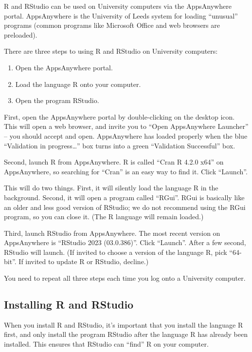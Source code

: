 \documentclass[
  a4paper,
]{book}
\providecommand{\tightlist}{%
  \setlength{\itemsep}{0pt}\setlength{\parskip}{0pt}}
\theoremstyle{definition}
\theoremstyle{definition}
\theoremstyle{definition}
\theoremstyle{definition}
\theoremstyle{remark}
\begin{document}
R and RStudio can be used on University computers via the AppsAnywhere portal. AppsAnywhere is the University of Leeds system for loading ``unusual'' programs (common programs like Microsoft Office and web browsers are preloaded).

There are three steps to using R and RStudio on University computers:

\begin{enumerate}
\def\labelenumi{\arabic{enumi}.}
\tightlist
\item
  Open the AppsAnywhere portal.
\item
  Load the language R onto your computer.
\item
  Open the program RStudio.
\end{enumerate}

First, open the AppsAnywhere portal by double-clicking on the desktop icon. This will open a web browser, and invite you to ``Open AppsAnywhere Launcher'' -- you should accept and open. AppsAnywhere has loaded properly when the blue ``Validation in progress\ldots{}'' box turns into a green ``Validation Successful'' box.

Second, launch R from AppsAnywhere. R is called ``Cran R 4.2.0 x64'' on AppsAnywhere, so searching for ``Cran'' is an easy way to find it. Click ``Launch''.

This will do two things. First, it will silently load the language R in the background. Second, it will open a program called ``RGui''. RGui is basically like an older and less good version of RStudio; we do not recommend using the RGui program, so you can close it. (The R language will remain loaded.)

Third, launch RStudio from AppsAnywhere. The most recent version on AppsAnywhere is ``RStudio 2023 (03.0.386)''. Click ``Launch''. After a few second, RStudio will launch. (If invited to choose a version of the language R, pick ``64-bit''. If invited to update R or RStudio, decline.)

You need to repeat all three steps each time you log onto a University computer.

\hypertarget{r-install}{%
\subsection*{Installing R and RStudio}\label{r-install}}

When you install R and RStudio, it's important that you install the language R first, and only install the program RStudio after the language R has already been installed. This ensures that RStudio can ``find'' R on your computer.
\end{document}
